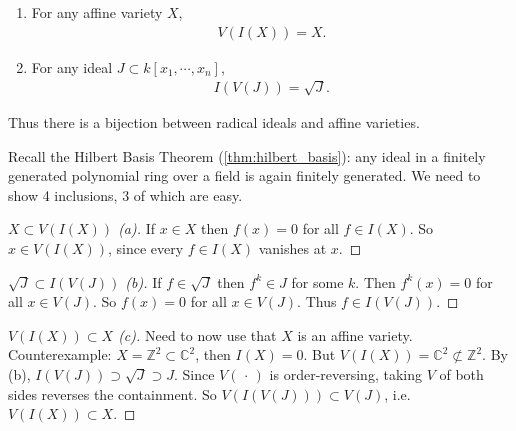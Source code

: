 \begin{theorem}

\envlist

\begin{enumerate}
\def\labelenumi{\alph{enumi}.}
\item
  For any affine variety \(X\),
  \begin{align*}
  V(I(X)) = X
  .\end{align*}
\item
  For any ideal \(J \subset k[x_1, \cdots, x_n]\),
  \begin{align*}
  I(V(J)) = \sqrt{J}
  .\end{align*}
\end{enumerate}

Thus there is a bijection between radical ideals and affine varieties.

\end{theorem}

Recall the Hilbert Basis Theorem (\cref{thm:hilbert_basis}): any ideal
in a finitely generated polynomial ring over a field is again finitely
generated. We need to show 4 inclusions, 3 of which are easy.

\begin{proof}[$X \subset V(I(X))$ (a)]

If \(x\in X\) then \(f(x) = 0\) for all \(f\in I(X)\). So
\(x\in V(I(X))\), since every \(f\in I(X)\) vanishes at \(x\).

\end{proof}

\begin{proof}[$\sqrt{J} \subset I(V(J))$ (b)]

If \(f\in \sqrt{J}\) then \(f^k \in J\) for some \(k\). Then
\(f^k(x) = 0\) for all \(x\in V(J)\). So \(f(x) = 0\) for all
\(x\in V(J)\). Thus \(f\in I(V(J))\).

\end{proof}

\begin{proof}[$V(I(X)) \subset X$ (c)]

Need to now use that \(X\) is an affine variety. Counterexample:
\(X = {\mathbb{Z}}^2 \subset {\mathbb{C}}^2\), then \(I(X) = 0\). But
\(V(I(X)) = {\mathbb{C}}^2 \not\subset {\mathbb{Z}}^2\). By (b),
\(I(V(J)) \supset \sqrt{J} \supset J\). Since \(V({\,\cdot\,})\) is
order-reversing, taking \(V\) of both sides reverses the containment. So
\(V(I(V(J))) \subset V(J)\), i.e.~\(V(I(X)) \subset X\).

\end{proof}

